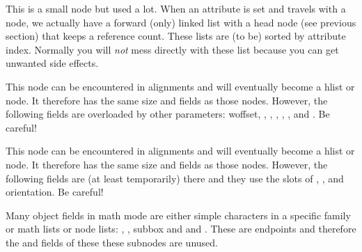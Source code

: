 

\stopsubsection

\startsubsection[title={attribute}]

This is a small node but used a lot. When an attribute is set and travels with a
node, we actually have a forward (only) linked list with a head node (see
previous section) that keeps a reference count. These lists are (to be) sorted by
attribute index. Normally you will {\em not} mess directly with these list
because you can get unwanted side effects.



\stopsubsection

\startsubsection[title={alignrecord}]

This node can be encountered in alignments and will eventually become a \type
{hlist} or  node. It therefore has the same size and fields as those
nodes. However, the following fields are overloaded by other parameters: \type
{woffset}, , , , ,
,  and . Be careful!



\stopsubsection

\startsubsection[title={unset}]

This node can be encountered in alignments and will eventually become a \type
{hlist} or  node. It therefore has the same size and fields as those
nodes. However, the following fields are (at least temporarily) there and they
use the slots of , ,  and \type
{orientation}. Be careful!



\stopsubsection

\stopsection

\startsection[title={Math nodes}]

\startsubsection[title=The concept]

Many object fields in math mode are either simple characters in a specific family
or math lists or node lists: , , {subbox}
and  and . These are endpoints and therefore the
 and  fields of these these subnodes are unused.

